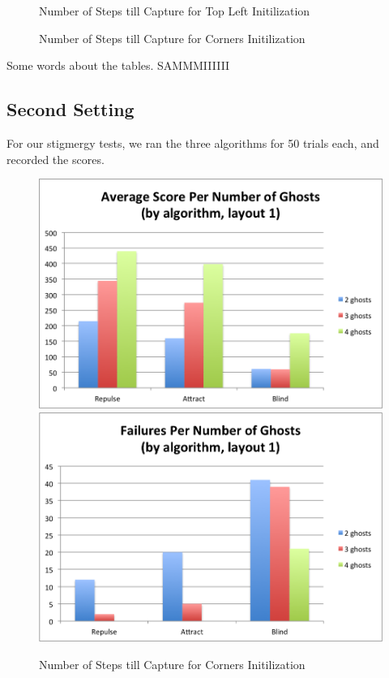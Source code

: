 \documentclass[11pt]{article}
\begin{document}
\begin{figure}[H]
	\caption{Number of Steps till Capture for Top Left Initilization}
\end{figure}

\begin{figure}[H]
	\caption{Number of Steps till Capture for Corners Initilization}
\end{figure}



\begin{multicols}{2}

Some words about the tables. SAMMMIIIIII

\subsection{Second Setting}
For our stigmergy tests, we ran the three algorithms for 50 trials each, and recorded the scores.  
\end{multicols}

\begin{figure}[H]
	\includegraphics[width=0.5 \columnwidth]{stigmergytrendclassicscore.png}
	\includegraphics[width= 0.5 \columnwidth]{stigmergytrendclassicfail.png}
	\caption{Number of Steps till Capture for Corners Initilization}
\end{figure}
\end{document}
